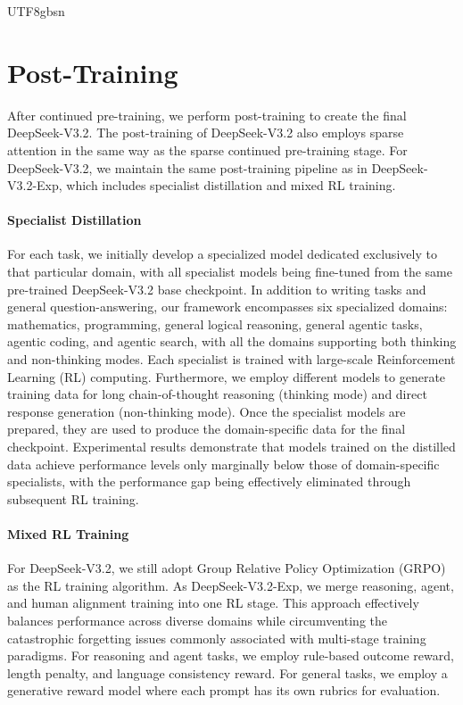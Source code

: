 \documentclass[11pt, a4paper, logo, copyright, nonumbering]{deepseek}
\def\newmodel{DeepSeek-V3.2}
\begin{document}
\begin{CJK*}{UTF8}{gbsn}
\section{Post-Training}

After continued pre-training, we perform post-training to create the final \newmodel{}.
The post-training of \newmodel{} also employs sparse attention in the same way as the sparse continued pre-training stage. 
For \newmodel{}, we maintain the same post-training pipeline as in DeepSeek-V3.2-Exp, which includes specialist distillation and mixed RL training. 

\paragraph{Specialist Distillation} For each task, we initially develop a specialized model dedicated exclusively to that particular domain, with all specialist models being fine-tuned from the same pre-trained DeepSeek-V3.2 base checkpoint. 
In addition to writing tasks and general question-answering, our framework encompasses six specialized domains: mathematics, programming, general logical reasoning, general agentic tasks, agentic coding, and agentic search, with all the domains supporting both thinking and non-thinking modes. 
Each specialist is trained with large-scale Reinforcement Learning (RL) computing.
Furthermore, we employ different models to generate training data for long chain-of-thought reasoning (thinking mode) and direct response generation (non-thinking mode). 
Once the specialist models are prepared, they are used to produce the domain-specific data for the final checkpoint. 
Experimental results demonstrate that models trained on the distilled data achieve performance levels only marginally below those of domain-specific specialists, with the performance gap being effectively eliminated through subsequent RL training.

\paragraph{Mixed RL Training} For \newmodel{}, we still adopt Group Relative Policy Optimization (GRPO)~\citep{deepseekmath,deepseekr1} as the RL training algorithm. 
As DeepSeek-V3.2-Exp, we merge reasoning, agent, and human alignment training into one RL stage. 
This approach effectively balances performance across diverse domains while circumventing the catastrophic forgetting issues commonly associated with multi-stage training paradigms. 
For reasoning and agent tasks, we employ rule-based outcome reward, length penalty, and language consistency reward. 
For general tasks, we employ a generative reward model where each prompt has its own rubrics for evaluation. 


\end{CJK*}
\end{document}
